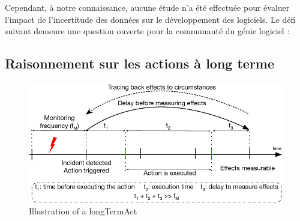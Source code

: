 %
Cependant, à notre connaissance, aucune étude n'a été effectuée pour évaluer l'impact de l'incertitude des données sur le développement des logiciels. 
Le défi suivant demeure une question ouverte pour la communauté du génie logiciel :
\vspace{-2em}

\subsection{Raisonnement sur les actions à long terme}

\begin{figure}
	\centering
	\includegraphics[width=0.9\linewidth]{img/chapt-intro/challenges/longTermAct}
	\caption{Illustration of a \gls{longTermAct}}
	\label{fig:french:chal:longTermAct}
\end{figure}

